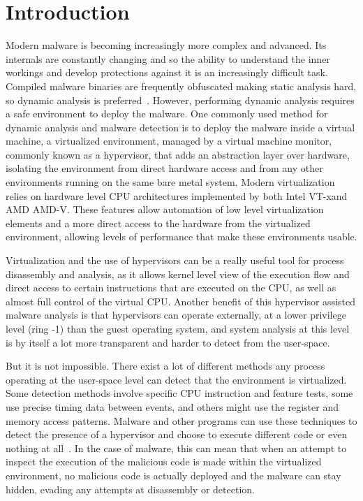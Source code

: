 \section{Introduction}\label{s:intro}

Modern malware is becoming increasingly more complex and advanced.
Its internals are constantly changing and so the ability to understand the inner workings and develop protections against it is an increasingly difficult task. 
Compiled malware binaries are frequently obfuscated making static analysis hard, so dynamic analysis is preferred~\cite{Leon2021, 10.1145/2245276.2232070}. However, performing dynamic analysis requires a safe environment 
to deploy the malware. One commonly used method for dynamic analysis and malware detection is to deploy the malware inside a virtual machine, a virtualized environment, managed by a virtual machine monitor, 
commonly known as a hypervisor, that adds an abstraction layer over hardware, isolating the environment from direct hardware access and from any other environments running on the same bare metal system. 
Modern virtualization relies on hardware level CPU architectures implemented by both Intel\textsuperscript{\tiny\textregistered} VT-x\texttrademark and AMD\textsuperscript{\tiny\textregistered} AMD-V\texttrademark. 
These features allow automation of low level virtualization elements and a more direct access to the hardware from the virtualized environment, allowing levels of performance that make these environments usable.

Virtualization and the use of hypervisors can be a really useful tool for process disassembly and analysis, as it allows kernel level view of the execution flow and direct access to certain instructions that are executed on the CPU, as well as almost full
control of the virtual CPU.
Another benefit of this hypervisor assisted malware analysis is that hypervisors can operate externally, at a lower privilege level (ring -1) than the guest operating system, 
and system analysis at this level is by itself a lot more transparent and harder to detect from the user-space.

But it is not impossible. There exist a lot of different methods any process operating at the user-space level can detect that the environment is virtualized. 
Some detection methods involve specific CPU instruction and feature tests, some use precise timing data between events, and others might use the register and memory access patterns. 
Malware and other programs can use these techniques to detect the presence of a hypervisor and choose to execute different code or even nothing at all~\cite{10.1109/TIFS.2020.2976559}. 
In the case of malware, this can mean that when an attempt to inspect the execution of the malicious code is made within the virtualized environment, 
no malicious code is actually deployed and the malware can stay hidden, evading any attempts at disassembly or detection.

